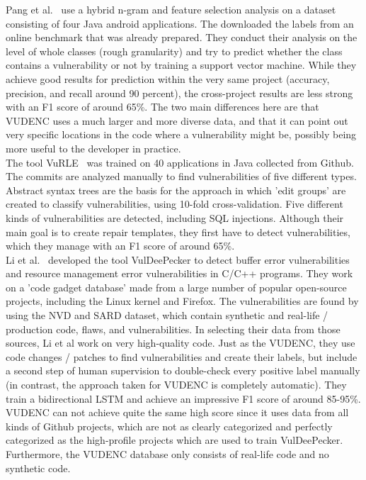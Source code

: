 \documentclass[
a4paper,
pagesize,
pdftex,
12pt,
twoside, %
BCOR=5mm, %
ngerman,
fleqn,
final,
]{scrartcl}
\begin{document}
	Pang et al.~\cite{Pang.2015} use a hybrid n-gram and feature selection analysis on a dataset consisting of four Java android applications. The downloaded the labels from an online benchmark that was already prepared. They conduct their analysis on the level of whole classes (rough granularity) and try to predict whether the class contains a vulnerability or not by training a support vector machine. While they achieve good results for prediction within the very same project (accuracy, precision, and recall around 90 percent), the cross-project results are less strong with an F1 score of around 65\%. The two main differences here are that VUDENC uses a much larger and more diverse data, and that it can point out very specific locations in the code where a vulnerability might be, possibly being more useful to the developer in practice.\\
	
	The tool VuRLE~\cite{Ma.2017} was trained on 40 applications in Java collected from Github. The commits are analyzed manually to find vulnerabilities of five different types. Abstract syntax trees are the basis for the approach in which 'edit groups' are created to classify vulnerabilities, using 10-fold cross-validation. Five different kinds of vulnerabilities are detected, including SQL injections. Although their main goal is to create repair templates, they first have to detect vulnerabilities, which they manage with an F1 score of around 65\%. \\
	
	Li et al.~\cite{Li.2018} developed the tool VulDeePecker to detect buffer error vulnerabilities and resource management error vulnerabilities in C/C++ programs. They work on a 'code gadget database' made from a large number of popular open-source projects, including the Linux kernel and Firefox. The vulnerabilities are found by using the NVD and SARD dataset, which contain synthetic and real-life / production code, flaws, and vulnerabilities. In selecting their data from those sources, Li et al work on very high-quality code. Just as the  VUDENC, they use code changes / patches to find vulnerabilities and create their labels, but include a second step of human supervision to double-check every positive label manually (in contrast, the approach taken for VUDENC is completely automatic). They train a bidirectional LSTM and achieve an impressive F1 score of around 85-95\%. VUDENC can not achieve quite the same high score since it uses data from all kinds of Github projects, which are not as clearly categorized and perfectly categorized as the high-profile projects which are used to train VulDeePecker. Furthermore, the VUDENC database only consists of real-life code and no synthetic code.\\
	
\end{document}
